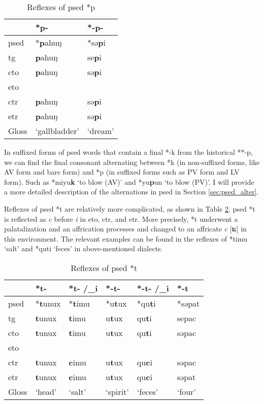\begin{table}[!htbp]
\centering
\caption{Reflexes of \acl{psed} *p}
\label{tab:psed_p}
\begin{tabular}{lll}
\hline
           & *p-    & *-p-  \\ \hline
\acs{psed} & *\textbf{p}ahuŋ & *sə\textbf{p}i \\ \hdashline
\acs{tg}   & \textbf{p}ahuŋ  & se\textbf{p}i  \\
\acs{cto}  & \textbf{p}ahuŋ  & sə\textbf{p}i  \\
\acs{eto}  &        &       \\
\acs{ctr}  & \textbf{p}ahuŋ  & sə\textbf{p}i  \\
\acs{etr}  & \textbf{p}ahuŋ  & sə\textbf{p}i  \\ \hline
Gloss      & `gallbladder'   & `dream'        \\ \hline
\end{tabular}
\end{table}

In suffixed forms of \acl{psed} words that contain a final *-k from the historical **-p, we can find the final consonant alternating between *k (in non-suffixed forms, like AV form and bare form) and *p (in suffixed forms such as PV form and LV form). Such as *miyu\textbf{k} `to blow (AV)' and *yu\textbf{p}un `to blow (PV)'. I will provide a more detailed description of the alternations in \acl{psed} in Section \ref{sec:psed_alter}.

Reflexes of \acl{psed} *t are relatively more complicated, as shown in Table \ref{tab:psed_t}. \acl{psed} *t is reflected as \textit{c} before \textit{i} in \acs{eto}, \acs{ctr}, and \acs{etr}. More precisely, *t underwent a palatalization and an affrication processes and changed to an affricate \textit{c} [ʨ] in this environment. The relevant examples can be found in the reflexes of *timu `salt' and *quti `feces' in above-mentioned dialects. 

\begin{table}[!htbp]
\centering
\caption{Reflexes of \acl{psed} *t}
\label{tab:psed_t}
\begin{tabular}{llllll}
\hline
           & *t-    & *t- /\_i & *-t-  & *-t- /\_i & *-t    \\ \hline
\acs{psed} & *\textbf{t}unux & *\textbf{t}imu    & *u\textbf{t}ux & *qu\textbf{t}i     & *səpat \\ \hdashline
\acs{tg}   & \textbf{t}unux  & \textbf{t}imu     & u\textbf{t}ux  & qu\textbf{t}i      & sepac  \\
\acs{cto}  & \textbf{t}unux  & \textbf{t}imu     & u\textbf{t}ux  & qu\textbf{t}i      & səpac  \\
\acs{eto}  &        &          &       &           &        \\
\acs{ctr}  & \textbf{t}unux  & \textbf{c}imu     & u\textbf{t}ux  & qu\textbf{c}i      & səpac  \\
\acs{etr}  & \textbf{t}unux  & \textbf{c}imu     & u\textbf{t}ux  & qu\textbf{c}i      & səpat  \\ \hline
Gloss      & `head' & `salt'   & `spirit' & `feces'  & `four' \\ \hline
\end{tabular}
\end{table}

